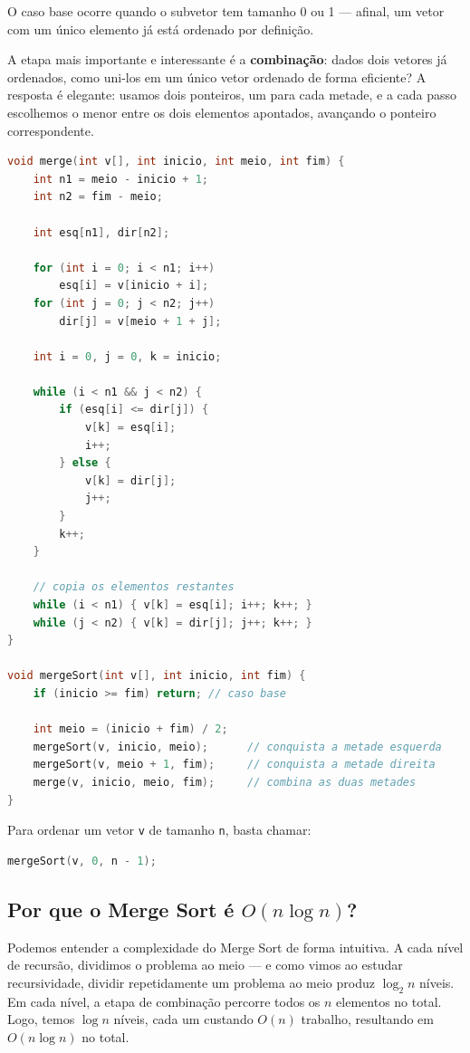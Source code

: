 \documentclass[12pt]{article}
\begin{document}
O caso base ocorre quando o subvetor tem tamanho 0 ou 1 — afinal, um vetor com um único elemento já está ordenado por definição.

A etapa mais importante e interessante é a \textbf{combinação}: dados dois vetores já ordenados, como uni-los em um único vetor ordenado de forma eficiente? A resposta é elegante: usamos dois ponteiros, um para cada metade, e a cada passo escolhemos o menor entre os dois elementos apontados, avançando o ponteiro correspondente.

\begin{lstlisting}[language=C++]
void merge(int v[], int inicio, int meio, int fim) {
    int n1 = meio - inicio + 1;
    int n2 = fim - meio;

    int esq[n1], dir[n2];

    for (int i = 0; i < n1; i++)
        esq[i] = v[inicio + i];
    for (int j = 0; j < n2; j++)
        dir[j] = v[meio + 1 + j];

    int i = 0, j = 0, k = inicio;

    while (i < n1 && j < n2) {
        if (esq[i] <= dir[j]) {
            v[k] = esq[i];
            i++;
        } else {
            v[k] = dir[j];
            j++;
        }
        k++;
    }

    // copia os elementos restantes
    while (i < n1) { v[k] = esq[i]; i++; k++; }
    while (j < n2) { v[k] = dir[j]; j++; k++; }
}

void mergeSort(int v[], int inicio, int fim) {
    if (inicio >= fim) return; // caso base

    int meio = (inicio + fim) / 2;
    mergeSort(v, inicio, meio);      // conquista a metade esquerda
    mergeSort(v, meio + 1, fim);     // conquista a metade direita
    merge(v, inicio, meio, fim);     // combina as duas metades
}
\end{lstlisting}

Para ordenar um vetor \texttt{v} de tamanho \texttt{n}, basta chamar:

\begin{lstlisting}[language=C++]
mergeSort(v, 0, n - 1);
\end{lstlisting}

\subsection{Por que o Merge Sort é $O(n \log n)$?}

Podemos entender a complexidade do Merge Sort de forma intuitiva. A cada nível de recursão, dividimos o problema ao meio — e como vimos ao estudar recursividade, dividir repetidamente um problema ao meio produz $\log_2 n$ níveis. Em cada nível, a etapa de combinação percorre todos os $n$ elementos no total. Logo, temos $\log n$ níveis, cada um custando $O(n)$ trabalho, resultando em $O(n \log n)$ no total.
\end{document}
